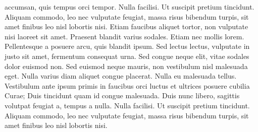 accumsan, quis tempus orci tempor. Nulla facilisi. Ut suscipit pretium tincidunt. Aliquam commodo, leo nec vulputate feugiat, massa risus bibendum turpis, sit amet finibus leo nisl lobortis nisi. Etiam faucibus aliquet tortor, non vulputate nisi laoreet sit amet. Praesent blandit varius sodales. Etiam nec mollis lorem. Pellentesque a posuere arcu, quis blandit ipsum. Sed lectus lectus, vulputate in justo sit amet, fermentum consequat urna. Sed congue neque elit, vitae sodales dolor euismod non. Sed euismod neque mauris, non vestibulum nisl malesuada eget. Nulla varius diam aliquet congue placerat. Nulla eu malesuada tellus. Vestibulum ante ipsum primis in faucibus orci luctus et ultrices posuere cubilia Curae; Duis tincidunt quam id congue malesuada. Duis nunc libero, sagittis volutpat feugiat a, tempus a nulla. Nulla facilisi. Ut suscipit pretium tincidunt. Aliquam commodo, leo nec vulputate feugiat, massa risus bibendum turpis, sit amet finibus leo nisl lobortis nisi.